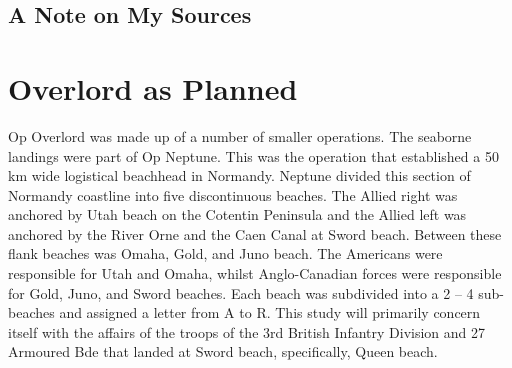 \documentclass[noraggedright]{turabian-researchpaper}
\begin{document}
	\subsection{A Note on My Sources}
		



\section{Overlord as Planned} %






Op Overlord was made up of a number of smaller operations.  The seaborne
landings were part of Op Neptune.  This was the operation that established a
50 km wide logistical beachhead in Normandy.  Neptune divided this section of
Normandy coastline into five discontinuous beaches.  The Allied right was 
anchored by Utah beach on the Cotentin Peninsula and the Allied left was 
anchored by the River Orne and the Caen Canal at Sword beach.  Between
these flank beaches was Omaha, Gold, and Juno beach.  The Americans were 
responsible for Utah and Omaha, whilst Anglo-Canadian forces were responsible
for Gold, Juno, and Sword beaches.  Each beach was subdivided into a 2 -- 4
sub-beaches and assigned a letter from A to R.  This study will primarily 
concern itself with the affairs of the troops of the 3rd British Infantry 
Division and 27 Armoured Bde that landed at Sword beach, specifically, Queen 
beach.  
\end{document}
